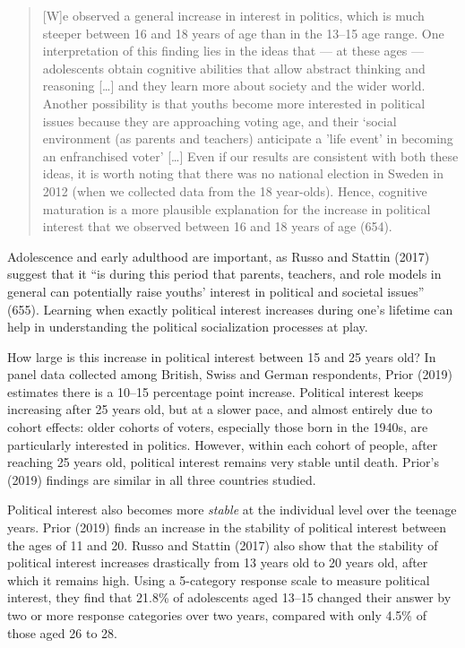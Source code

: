 \documentclass[
  letterpaper,
  DIV=11,
  numbers=noendperiod]{scrreprt}
\begin{document}
\begin{quote}
{[}W{]}e observed a general increase in interest in politics, which is
much steeper between 16 and 18 years of age than in the 13--15 age
range. One interpretation of this finding lies in the ideas that --- at
these ages --- adolescents obtain cognitive abilities that allow
abstract thinking and reasoning {[}\ldots{]} and they learn more about
society and the wider world. Another possibility is that youths become
more interested in political issues because they are approaching voting
age, and their `social environment (as parents and teachers) anticipate
a 'life event' in becoming an enfranchised voter' {[}\ldots{]} Even if
our results are consistent with both these ideas, it is worth noting
that there was no national election in Sweden in 2012 (when we collected
data from the 18 year-olds). Hence, cognitive maturation is a more
plausible explanation for the increase in political interest that we
observed between 16 and 18 years of age (654).
\end{quote}

Adolescence and early adulthood are important, as Russo and Stattin
(2017) suggest that it ``is during this period that parents, teachers,
and role models in general can potentially raise youths' interest in
political and societal issues'' (655). Learning when exactly political
interest increases during one's lifetime can help in understanding the
political socialization processes at play.

How large is this increase in political interest between 15 and 25 years
old? In panel data collected among British, Swiss and German
respondents, Prior (2019) estimates there is a 10--15 percentage point
increase. Political interest keeps increasing after 25 years old, but at
a slower pace, and almost entirely due to cohort effects: older cohorts
of voters, especially those born in the 1940s, are particularly
interested in politics. However, within each cohort of people, after
reaching 25 years old, political interest remains very stable until
death. Prior's (2019) findings are similar in all three countries
studied.

Political interest also becomes more \emph{stable} at the individual
level over the teenage years. Prior (2019) finds an increase in the
stability of political interest between the ages of 11 and 20. Russo and
Stattin (2017) also show that the stability of political interest
increases drastically from 13 years old to 20 years old, after which it
remains high. Using a 5-category response scale to measure political
interest, they find that 21.8\% of adolescents aged 13--15 changed their
answer by two or more response categories over two years, compared with
only 4.5\% of those aged 26 to 28.
\end{document}
